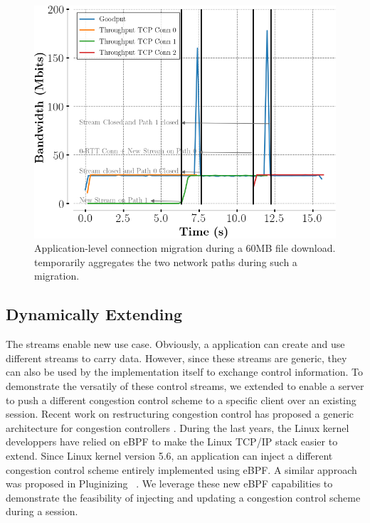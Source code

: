 \begin{figure}[!t]
  \begin{center}
    \includegraphics[width=.8\columnwidth]{figures/migration.png}
  \end{center}
\vspace{-0.5cm}
  \caption{Application-level connection migration during a 60MB file download.
    \tcpls temporarily aggregates the two network paths during such a migration.}
  \label{fig:conn_migration}
\end{figure}



\subsection{Dynamically Extending \tcpls}

The \tcpls streams enable new use case. Obviously, a \tcpls application can
create and use different streams to carry data. However, since these streams
are generic, they can also be used by the \tcpls implementation itself to
exchange control information. To demonstrate the versatily of these control
streams, we extended \tcpls to enable a server to push a different congestion
control scheme to a specific client over an existing \tcpls session. Recent
work on restructuring congestion control has proposed a generic architecture
for congestion controllers \cite{narayan2018restructuring}.
During the last years, the Linux kernel developpers have relied on eBPF
to make the Linux TCP/IP stack \cite{brakmo2017tcp,tran2020beyond} easier
to extend. Since Linux kernel version 5.6, an application can inject
a different congestion control scheme entirely implemented using eBPF. A similar
approach was proposed in Pluginizing \quic~\cite{de2019pluginizing}. We
leverage these new eBPF capabilities to demonstrate the feasibility of injecting
and updating a congestion control scheme during a \tcpls session.

